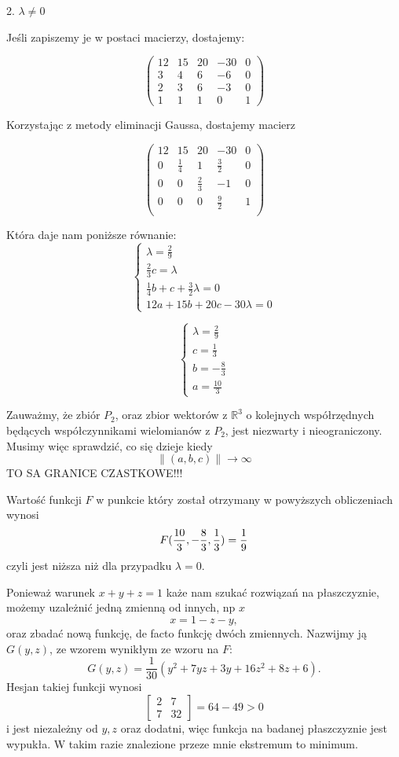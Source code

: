 \documentclass{article}[13pt]
\newcommand{\R}{\mathds{R}}
\begin{document}
    {\color{def}2. $\lambda\neq0$}
    \medskip

    Jeśli zapiszemy je w postaci macierzy, dostajemy:
    
    $$
        \begin{pmatrix}
            12 &15& 20& -30& 0\\
            3 & 4& 6& -6& 0\\
            2 &3& 6& -3& 0\\
            1& 1& 1& 0& 1
        \end{pmatrix}
    $$

    Korzystając z metody eliminacji Gaussa, dostajemy macierz

    $$
        \begin{pmatrix}
            12 & 15	& 20&	-30&	0\\
            0&	\frac14	&  1&	\frac32&	0\\
            0	&  0	&\frac23	 &-1&	0\\
            0	&  0	&  0&	\frac92	&1\\
        \end{pmatrix}
    $$

    Która daje nam poniższe równanie:
    $$
        \begin{cases}
            \lambda=\frac29\\
            \frac23c=\lambda\\
            \frac14b+c+\frac32\lambda=0\\
            12a+15b+20c-30\lambda=0
        \end{cases}
    $$

    $$
        \begin{cases}
            \lambda=\frac29\\
            c=\frac13\\
            b=-\frac83\\
            a=\frac{10}3
        \end{cases}
    $$

    Zauważmy, że zbiór $P_2$, oraz zbior wektorów z $\R^3$ o kolejnych współrzędnych będących współczynnikami wielomianów z $P_2$, jest niezwarty i nieograniczony. Musimy więc sprawdzić, co się dzieje kiedy
    $$\|(a,b,c)\|\to\infty$$
        {\color{blue}TO SA GRANICE CZASTKOWE!!!}
    \medskip

    Wartość funkcji $F$ w punkcie który został otrzymany w powyższych obliczeniach wynosi
    $$F({10\over3},-\frac83,\frac13)=\frac19$$
    czyli jest niższa niż dla przypadku $\lambda=0$.
    \medskip
    

    Ponieważ warunek $x+y+z=1$ każe nam szukać rozwiązań na płaszczyznie, możemy uzależnić jedną zmienną od innych, np $x$ 
    $$x=1-z-y,$$
    oraz zbadać nową funkcję, de facto funkcję dwóch zmiennych. Nazwijmy ją $G(y,z)$, ze wzorem wynikłym ze wzoru na $F$:
    $$G(y,z)=\frac1{30}(y^2+7yz+3y+16z^2+8z+6).$$
    Hesjan takiej funkcji wynosi
    $$
        \begin{bmatrix}
            2 & 7\\
            7 & 32
        \end{bmatrix}=64-49>0
    $$
    i jest niezależny od $y,z$ oraz dodatni, więc funkcja na badanej płaszczyznie jest wypukła. W takim razie znalezione przeze mnie ekstremum to minimum.
\end{document}
